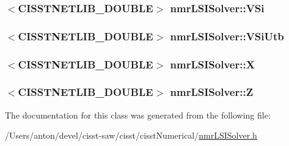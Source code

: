 \subsubsection[{V\+Si}]{$<$C\+I\+S\+S\+T\+N\+E\+T\+L\+I\+B\+\_\+\+D\+O\+U\+B\+L\+E$>$ nmr\+L\+S\+I\+Solver\+::\+V\+Si\hspace{0.3cm}{\ttfamily [protected]}}\label{classnmr_l_s_i_solver_aa7fbd3d91531ea1010e4abf548c02d44}
\hypertarget{classnmr_l_s_i_solver_aacd1cede77ef83f0b256bdf0313c723a}{}
\subsubsection[{V\+Si\+Utb}]{$<$C\+I\+S\+S\+T\+N\+E\+T\+L\+I\+B\+\_\+\+D\+O\+U\+B\+L\+E$>$ nmr\+L\+S\+I\+Solver\+::\+V\+Si\+Utb\hspace{0.3cm}{\ttfamily [protected]}}\label{classnmr_l_s_i_solver_aacd1cede77ef83f0b256bdf0313c723a}
\hypertarget{classnmr_l_s_i_solver_ac38debb9bd9fe2ab5de72a8c43195de5}{}
\subsubsection[{X}]{$<$C\+I\+S\+S\+T\+N\+E\+T\+L\+I\+B\+\_\+\+D\+O\+U\+B\+L\+E$>$ nmr\+L\+S\+I\+Solver\+::\+X\hspace{0.3cm}{\ttfamily [protected]}}\label{classnmr_l_s_i_solver_ac38debb9bd9fe2ab5de72a8c43195de5}
\hypertarget{classnmr_l_s_i_solver_a4d7c8e1a6139189dc37329bfd6743ae6}{}
\subsubsection[{Z}]{$<$C\+I\+S\+S\+T\+N\+E\+T\+L\+I\+B\+\_\+\+D\+O\+U\+B\+L\+E$>$ nmr\+L\+S\+I\+Solver\+::\+Z\hspace{0.3cm}{\ttfamily [protected]}}\label{classnmr_l_s_i_solver_a4d7c8e1a6139189dc37329bfd6743ae6}


The documentation for this class was generated from the following file\+:\begin{DoxyCompactItemize}
\item 
/\+Users/anton/devel/cisst-\/saw/cisst/cisst\+Numerical/\hyperlink{nmr_l_s_i_solver_8h}{nmr\+L\+S\+I\+Solver.\+h}\end{DoxyCompactItemize}
